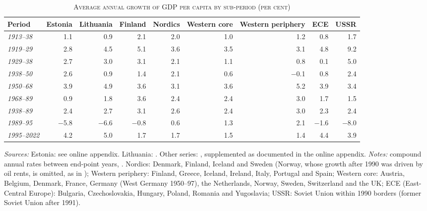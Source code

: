\begin{table}[htbp]
\centering\small\setlength{\tabcolsep}{3.5pt}
\caption[Average annual growth of GDP per capita by sub-period (per cent)]{\textsc{Average annual growth of GDP per capita by sub-period (per cent)}}
\label{tab:growth}
\begin{threeparttable}
\begin{tabular}{lrrrrrrrr}
\toprule
Period & Estonia & Lithuania & Finland & Nordics & Western core & Western periphery & ECE & USSR \\
\midrule
\textit{1913--38} & 1.1 & 0.9 & 2.1 & 2.0 & 1.0 & 1.2 & 0.8 & 1.7 \\
\midrule
\textit{1919--29} & 2.8 & 4.5 & 5.1 & 3.6 & 3.5 & 3.1 & 4.8 & 9.2 \\
\textit{1929--38} & 2.7 & 3.0 & 3.1 & 2.1 & 1.1 & 0.8 & 0.1 & 5.0 \\
\midrule
\textit{1938--50} & 2.6 & 0.9 & 1.4 & 2.1 & 0.6 & $-$0.1 & 0.8 & 2.4 \\
\textit{1950--68} & 3.9 & 4.9 & 3.6 & 3.1 & 3.6 & 5.2 & 3.9 & 3.4 \\
\textit{1968--89} & 0.9 & 1.8 & 3.6 & 2.4 & 2.4 & 3.0 & 1.7 & 1.5 \\
\textit{1938--89} & 2.4 & 2.7 & 3.1 & 2.6 & 2.4 & 3.0 & 2.3 & 2.4 \\
\midrule
\textit{1989--95} & $-$5.8 & $-$6.6 & $-$0.8 & 0.6 & 1.3 & 2.1 & $-$1.6 & $-$8.0 \\
\textit{1995--2022} & 4.2 & 5.0 & 1.7 & 1.7 & 1.5 & 1.4 & 4.4 & 3.9 \\
\bottomrule
\end{tabular}
\begin{tablenotes}
\footnotesize
\textit{Sources:} Estonia: see online appendix. Lithuania: \cite{klimantas2026soviet}. Other series: \cite{mpd2023}, supplemented as documented in the online appendix. \textit{Notes:} compound annual rates between end-point years, \intlnineteen{}. Nordics: Denmark, Finland, Iceland and Sweden (Norway, whose growth after 1990 was driven by oil rents, is omitted, as in \cite{klimantas2025thesis}); Western periphery: Finland, Greece, Iceland, Ireland, Italy, Portugal and Spain; Western core: Austria, Belgium, Denmark, France, Germany (West Germany 1950--97), the Netherlands, Norway, Sweden, Switzerland and the UK; ECE (East-Central Europe): Bulgaria, Czechoslovakia, Hungary, Poland, Romania and Yugoslavia; USSR: Soviet Union within 1990 borders (former Soviet Union after 1991).
\end{tablenotes}
\end{threeparttable}
\end{table}

